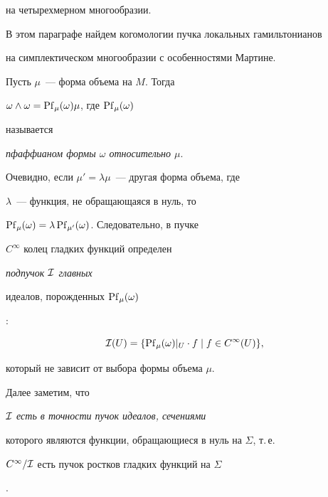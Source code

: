 на четырехмерном многообразии.


В этом параграфе найдем когомологии пучка локальных гамильтонианов


на симплектическом многообразии с особенностями Мартине.








Пусть $\mu$~--- форма объема на $M$. Тогда


$\omega \wedge \omega = \operatorname{Pf}_\mu(\omega) \mu$, где $\operatorname{Pf}_\mu(\omega)$


называется


{\em пфаффианом формы $\omega$ относительно $\mu$}.


Очевидно, если $\mu' = \lambda \mu$~--- другая форма объема, где


$\lambda$~--- функция, не обращающаяся в нуль, то


$\operatorname{Pf}_\mu(\omega) = \lambda \operatorname{Pf}_{\mu'}(\omega)$. Следовательно, в пучке


$C^\infty$ колец гладких функций определен {\em подпучок ${\cal I}$ главных


идеалов, порожденных $\operatorname{Pf}_\mu(\omega)$}:


$$


 \cI(U) = \{\rest{\Pf_\mu(\omega)}{U} \cdot f \mid f \in C^\infty(U)\},


$$


который не зависит от выбора формы объема $\mu$.





Далее заметим, что {\em ${\cal I}$ есть в точности пучок идеалов, сечениями


которого являются функции, обращающиеся в нуль на $\Sigma$, т.\,е.


$C^\infty/{\cal I}$ есть пучок ростков гладких функций на $\Sigma$}.








